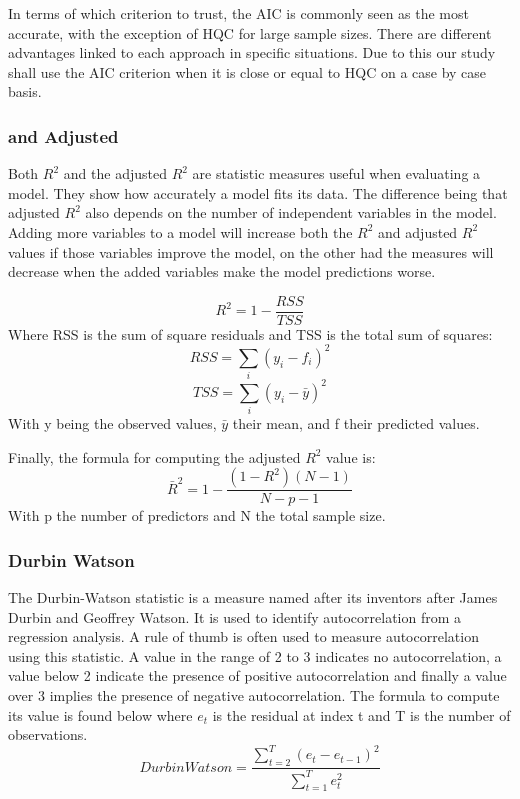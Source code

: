 In terms of which criterion to trust, the AIC is commonly seen as the most accurate, with the exception of HQC for large sample sizes. There are different advantages linked to each approach in specific situations. Due to this our study shall use the AIC criterion when it is close or equal to HQC on a case by case basis.

\subsubsection{ and Adjusted }

Both $R^2$ and the adjusted $R^2$ are statistic measures useful when evaluating a model. They show how accurately a model fits its data. The difference being that adjusted $R^2$ also depends on the number of independent variables in the model. Adding more variables to a model will increase both the $R^2$ and adjusted $R^2$ values if those variables improve the model, on the other had the measures will decrease when the added variables make the model predictions worse.

\begin{equation}
    R^2 = 1 - \frac{RSS}{TSS}
\end{equation}
Where RSS is the sum of square residuals and TSS is the total sum of squares:
\begin{equation*}
    RSS = \sum_{i} (y_{i} - f_{i})^2
\end{equation*}
\begin{equation*}
    TSS = \sum_{i}(y_{i} - \bar{y})^{2}
\end{equation*}
With y being the observed values, $\bar{y}$ their mean, and f their predicted values.

Finally, the formula for computing the adjusted $R^2$ value is:
\begin{equation}
    \bar{R}^{2} = 1 - \frac{(1 - R^2)(N - 1)}{N - p - 1}
\end{equation}
With p the number of predictors and N the total sample size.

\subsubsection{Durbin Watson}

The Durbin-Watson statistic is a measure named after its inventors after James Durbin and Geoffrey Watson. It is used to identify autocorrelation from a regression analysis. A rule of thumb is often used to measure autocorrelation using this statistic. A value in the range of 2 to 3 indicates no autocorrelation, a value below 2 indicate the presence of positive autocorrelation and finally a value over 3 implies the presence of negative autocorrelation. The formula to compute its value is found below where $e_{t}$ is the residual at index t and T is the number of observations.
\begin{equation}
    DurbinWatson = \frac{\sum_{t=2}^{T}(e_{t} - e_{t-1})^{2}}{\sum_{t=1}^{T}e_{t}^{2}}
\end{equation}

